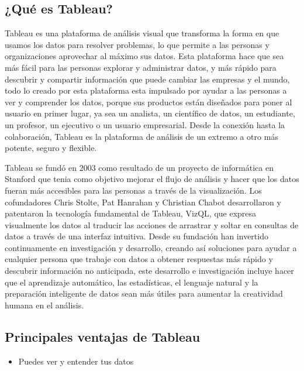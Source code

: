 \documentclass[
]{book}
\providecommand{\tightlist}{%
  \setlength{\itemsep}{0pt}\setlength{\parskip}{0pt}}
\begin{document}
\hypertarget{quuxe9-es-tableau}{%
\subsection{¿Qué es Tableau?}\label{quuxe9-es-tableau}}

Tableau es una plataforma de análisis visual que transforma la forma en que usamos los datos para resolver problemas, lo que permite a las personas y organizaciones aprovechar al máximo sus datos. Esta plataforma hace que sea más fácil para las personas explorar y administrar datos, y más rápido para descubrir y compartir información que puede cambiar las empresas y el mundo, todo lo creado por esta plataforma esta impulsado por ayudar a las personas a ver y comprender los datos, porque sus productos están diseñados para poner al usuario en primer lugar, ya sea un analista, un científico de datos, un estudiante, un profesor, un ejecutivo o un usuario empresarial. Desde la conexión hasta la colaboración, Tableau es la plataforma de análisis de un extremo a otro más potente, seguro y flexible.

Tableau se fundó en 2003 como resultado de un proyecto de informática en Stanford que tenia como objetivo mejorar el flujo de análisis y hacer que los datos fueran más accesibles para las personas a través de la visualización. Los cofundadores Chris Stolte, Pat Hanrahan y Christian Chabot desarrollaron y patentaron la tecnología fundamental de Tableau, VizQL, que expresa visualmente los datos al traducir las acciones de arrastrar y soltar en consultas de datos a través de una interfaz intuitiva. Desde su fundación han invertido continuamente en investigación y desarrollo, creando así soluciones para ayudar a cualquier persona que trabaje con datos a obtener respuestas más rápido y descubrir información no anticipada, este desarrollo e investigación incluye hacer que el aprendizaje automático, las estadísticas, el lenguaje natural y la preparación inteligente de datos sean más útiles para aumentar la creatividad humana en el análisis.

\hypertarget{principales-ventajas-de-tableau}{%
\subsection{Principales ventajas de Tableau}\label{principales-ventajas-de-tableau}}

\begin{itemize}
\tightlist
\item
  Puedes ver y entender tus datos
\end{itemize}
\end{document}
